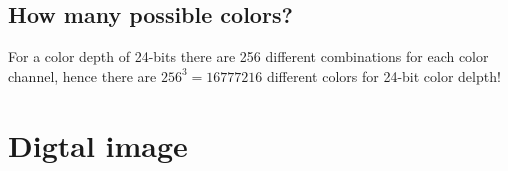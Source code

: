 \subsection{How many possible colors?}
\label{sec:how-many-possible-colors}

For a color depth of 24-bits there are 256 different combinations for
each color channel, hence there are $256^3 = 16777216$ different
colors for 24-bit color delpth! %


\section{Digtal image}
\label{sec:digtal-image}

\cite{ohlsson99:_digit_bild_kreat}



\printbibliography[heading=subbibliography]